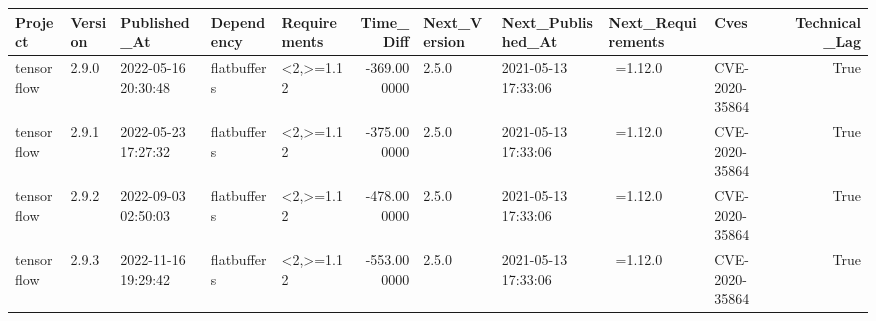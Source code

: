 \begin{tabular}{lllllrllllr}
\toprule
Project & Version & Published_At & Dependency & Requirements & Time_Diff & Next_Version & Next_Published_At & Next_Requirements & Cves & Technical_Lag \\
\midrule
tensorflow & 2.9.0 & 2022-05-16 20:30:48 & flatbuffers & <2,>=1.12 & -369.000000 & 2.5.0 & 2021-05-13 17:33:06 & ~=1.12.0 & CVE-2020-35864 & True \\
tensorflow & 2.9.1 & 2022-05-23 17:27:32 & flatbuffers & <2,>=1.12 & -375.000000 & 2.5.0 & 2021-05-13 17:33:06 & ~=1.12.0 & CVE-2020-35864 & True \\
tensorflow & 2.9.2 & 2022-09-03 02:50:03 & flatbuffers & <2,>=1.12 & -478.000000 & 2.5.0 & 2021-05-13 17:33:06 & ~=1.12.0 & CVE-2020-35864 & True \\
tensorflow & 2.9.3 & 2022-11-16 19:29:42 & flatbuffers & <2,>=1.12 & -553.000000 & 2.5.0 & 2021-05-13 17:33:06 & ~=1.12.0 & CVE-2020-35864 & True \\
\bottomrule
\end{tabular}
